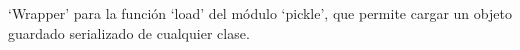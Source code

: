 \documentclass[letterpaper,10pt,english]{sphinxmanual}
\begin{document}

\begin{fulllineitems}
\label{\detokenize{myfpga:myfpga.ring_osc.load}}
\pysigstartsignatures
{}
\pysigstopsignatures
\sphinxAtStartPar
‘Wrapper’ para la función ‘load’ del módulo
‘pickle’, que permite cargar un objeto guardado serializado de
cualquier clase.

\end{fulllineitems}

\end{document}

